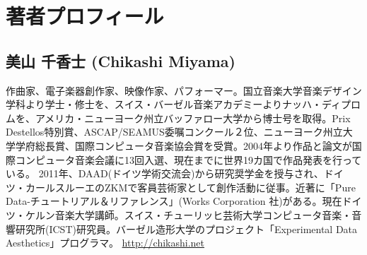\documentclass{jsarticle}
\begin{document}
\section{著者プロフィール}
\subsection{美山 千香士 (Chikashi Miyama)}
作曲家、電子楽器創作家、映像作家、パフォーマー。国立音楽大学音楽デザイン学科より学士・修士を、スイス・バーゼル音楽アカデミーよりナッハ・ディプロムを、アメリカ・ニューヨーク州立バッファロー大学から博士号を取得。Prix Destellos特別賞、ASCAP/SEAMUS委嘱コンクール２位、ニューヨーク州立大学学府総長賞、国際コンピュータ音楽協会賞を受賞。2004年より作品と論文が国際コンピュータ音楽会議に13回入選、現在までに世界19カ国で作品発表を行っている。 2011年、DAAD(ドイツ学術交流会)から研究奨学金を授与され、ドイツ・カールスルーエのZKMで客員芸術家として創作活動に従事。近著に「Pure Data-チュートリアル＆リファレンス」(Works Corporation 社)がある。現在ドイツ・ケルン音楽大学講師。スイス・チューリッヒ芸術大学コンピュータ音楽・音響研究所(ICST)研究員。バーゼル造形大学のプロジェクト「Experimental Data Aesthetics」プログラマ。
\url{http://chikashi.net}
\end{document}
